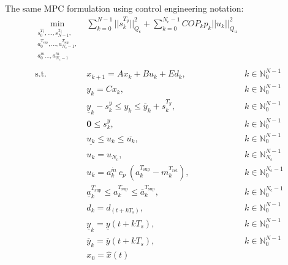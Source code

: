 \documentclass[10pt]{article}
\begin{document}
The same MPC formulation  using control engineering notation:
\begin{subequations}
\label{eq:mpc_general}
\begin{align}
 \min_{\substack{s^{T_{\text{z}}}_0, \ldots, s^{T_{\text{z}}}_{N-1}, \\
 a^{T_\text{sup}}_0, \ldots, a^{T_\text{sup}}_{N_{\text{c}}-1}, \\
 a^{\dot{m}}_0  \ldots, a^{\dot{m}}_{N_{\text{c}}-1} \\
 }} & \sum_{k=0}^{N-1}  
 || s^{T_{y}}_k ||_{Q_{\text{s}}}^2 +  \sum_{k=0}^{N_{\text{c}}-1} COP_k p_k || u_{k} ||_{Q_\text{u}}^2   
 \label{eq:mpc_general:cost}\\
  \text{s.t.} \ & x_{k+1} = A x_k+ B  u_{k} +E d_k, & k \in \mathbb{N}_{0}^{N-1} \label{eq:mpc_general:x} \\
  & y_{k} = C x_k, & k \in \mathbb{N}_{0}^{N-1} \label{eq:mpc_general:y} \\
  & \underline{y}_{k} - s^{y}_k \le y_{k} \le \overline{y}_k + s^{T_{y}}_k, & k \in \mathbb{N}_{0}^{N-1} \label{eq:mpc_general:zone} \\
   & \mathbf{0} \le s^{y}_k  ,  & k \in \mathbb{N}_{0}^{N-1} \label{eq:mpc_general:lb_sk}\\
  &  \underline{u_k} \le  u_{k} \le \overline{u_k},  & k \in \mathbb{N}_{0}^{N-1} \label{eq:mpc_general:ub}\\
    &  u_{k} = u_{N_{\text{c}}} , & k \in \mathbb{N}_{N_{\text{c}}}^{N-1} \label{eq:mpc_general:move_block} \\
   &  u_{k}  =  a^{\dot{m}}_k \ c_p \ (a^{T_\text{sup}}_k -  m^{T_\text{ret}}_k),  & k \in \mathbb{N}_{0}^{N_{\text{c}}-1} \label{eq:NLP_postprocess:heat_equation} \\
   &  \underline{a}^{T_\text{sup}}_k \le a^{T_\text{sup}}_k \le \overline{a}^{T_\text{sup}}_k,
    & k \in \mathbb{N}_{0}^{N_{\text{c}}-1}  \label{eq:NLP_postprocess:tsup_minmax}\\
   & d_{k} =  d_(t+ k T_s), & k \in \mathbb{N}_{0}^{N-1} \label{eq:mpc_general:d0} \\
  & \underline{y}_{k} =  \underline{y}(t+ k T_s), & k \in \mathbb{N}_{0}^{N-1} \label{eq:mpc_general:r_low} \\
    & \overline{y}_{k} =  \overline{y}(t+ k T_s), & k \in \mathbb{N}_{0}^{N-1} \label{eq:mpc_general:r_up} \\
  & x_0 = \hat{x}(t) \label{eq:mpc_general:x0}
\end{align}
\end{subequations}
\end{document}
